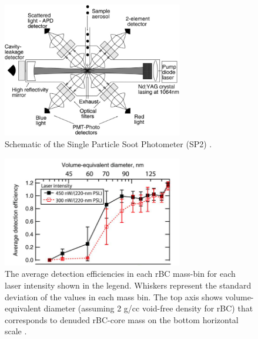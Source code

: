 \documentclass[12pt, fullpage]{uiucthesis2009}
\begin{document}
	\begin{figure}[h] 
		\begin{center}
			\includegraphics[width = 0.7\textwidth]{Figure09}
			\caption[Schematic of the Single Particle Soot Photometer (SP2) \citep{schwarz2010global}.]{\label{fig_P9} Schematic of the Single Particle Soot Photometer (SP2) \citep{schwarz2010global}.}
		\end{center}
	\end{figure}
	
	\begin{figure}[h] 
		\begin{center}
			\includegraphics[width = 0.7\textwidth]{Figure08}
			\caption[The average detection efficiencies in each rBC mass-bin for each laser intensity shown in the legend. Whiskers represent the standard deviation of the values in each mass bin. The top axis shows volume-equivalent diameter (assuming 2 g/cc void-free density for rBC) that corresponds to denuded rBC-core mass on the bottom horizontal scale \citep{schwarz2010global}]{\label{fig_P8} The average detection efficiencies in each rBC mass-bin for each laser intensity shown in the legend. Whiskers represent the standard deviation of the values in each mass bin. The top axis shows volume-equivalent diameter (assuming 2 g/cc void-free density for rBC) that corresponds to denuded rBC-core mass on the bottom horizontal scale \citep{schwarz2010global}.}
		\end{center}
	\end{figure}
\end{document}
